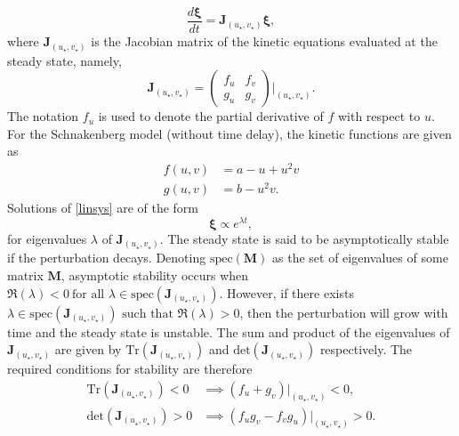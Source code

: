 \begin{equation}\label{linsys}
\frac{d\pmb{\xi}}{dt}=\textbf{J}_{(u_\star,v_\star)}\pmb{\xi},
\end{equation}
where $\textbf{J}_{(u_\star,v_\star)}$ is the Jacobian matrix of the kinetic equations evaluated at the steady state, namely,
$$
\textbf{J}_{(u_\star,v_\star)}=\begin{pmatrix}f_u&f_v\\g_u&g_v\end{pmatrix}\Bigg|_{(u_\star,v_\star)}.
$$
The notation $f_u$ is used to denote the partial derivative of $f$ with respect to $u$. For the Schnakenberg model (without time delay), the kinetic functions are given as
\begin{align*}
f(u,v)&=a-u+u^2v\\
g(u,v)&=b-u^2v.
\end{align*}
Solutions of \eqref{linsys} are of the form
$$
\pmb{\xi}\propto e^{\lambda t},
$$
for eigenvalues $\lambda$ of $\textbf{J}_{(u_\star,v_\star)}$. The steady state is said to be asymptotically stable if the perturbation decays.
Denoting $\text{spec}(\textbf{M})$ as the set of eigenvalues of some matrix $\textbf{M}$, asymptotic stability occurs when $\Re(\lambda)<0 \ \text{for all }\lambda\in \text{spec}(\textbf{J}_{(u_\star,v_\star)})$. However, if there exists $\lambda\in \text{spec}(\textbf{J}_{(u_\star,v_\star)})\text{ such that } \Re(\lambda)>0$,
then the perturbation will grow with time and the steady state is unstable. The sum and product of the eigenvalues of $\textbf{J}_{(u_\star,v_\star)}$
are given by $\text{Tr}(\textbf{J}_{(u_\star,v_\star)})$ and $\text{det}(\textbf{J}_{(u_\star,v_\star)})$ respectively. The required conditions for stability are therefore
\begin{equation}\label{cond1}
    \begin{split}
\text{Tr}(\textbf{J}_{(u_\star,v_\star)})<0 &\implies (f_u+g_v)\big|_{(u_\star,v_\star)}<0, \\
\text{det}(\textbf{J}_{(u_\star,v_\star)})>0 &\implies (f_ug_v-f_vg_u)\big|_{(u_\star,v_\star)}>0.
\end{split}
\end{equation}

